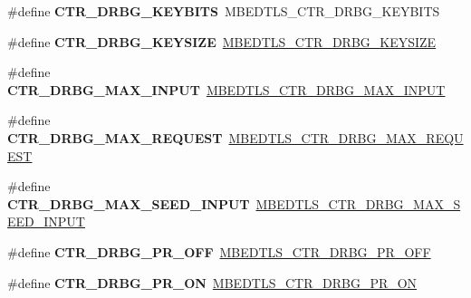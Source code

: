 \begin{DoxyCompactItemize}
\item 
\mbox{\label{compat-1_83_8h_ad7fddfff369d259329ff0f7c64063da0}} 
\#define {\bfseries C\+T\+R\+\_\+\+D\+R\+B\+G\+\_\+\+K\+E\+Y\+B\+I\+TS}~M\+B\+E\+D\+T\+L\+S\+\_\+\+C\+T\+R\+\_\+\+D\+R\+B\+G\+\_\+\+K\+E\+Y\+B\+I\+TS
\item 
\mbox{\label{compat-1_83_8h_a7e724588e94f73bd3fb7623e3f191913}} 
\#define {\bfseries C\+T\+R\+\_\+\+D\+R\+B\+G\+\_\+\+K\+E\+Y\+S\+I\+ZE}~\mbox{\hyperlink{ctr__drbg_8h_af81b83e7d7d9709f0b61c6ee34ee848e}{M\+B\+E\+D\+T\+L\+S\+\_\+\+C\+T\+R\+\_\+\+D\+R\+B\+G\+\_\+\+K\+E\+Y\+S\+I\+ZE}}
\item 
\mbox{\label{compat-1_83_8h_aa422ee06cd5836113c0068996fa9560c}} 
\#define {\bfseries C\+T\+R\+\_\+\+D\+R\+B\+G\+\_\+\+M\+A\+X\+\_\+\+I\+N\+P\+UT}~\mbox{\hyperlink{ctr__drbg_8h_a9eeb62804173b22977cca5a7565bbe78}{M\+B\+E\+D\+T\+L\+S\+\_\+\+C\+T\+R\+\_\+\+D\+R\+B\+G\+\_\+\+M\+A\+X\+\_\+\+I\+N\+P\+UT}}
\item 
\mbox{\label{compat-1_83_8h_a97273e0c80ab6111bf79f05834f174bf}} 
\#define {\bfseries C\+T\+R\+\_\+\+D\+R\+B\+G\+\_\+\+M\+A\+X\+\_\+\+R\+E\+Q\+U\+E\+ST}~\mbox{\hyperlink{ctr__drbg_8h_a5b787e6157d91055d7c07d40f519cf52}{M\+B\+E\+D\+T\+L\+S\+\_\+\+C\+T\+R\+\_\+\+D\+R\+B\+G\+\_\+\+M\+A\+X\+\_\+\+R\+E\+Q\+U\+E\+ST}}
\item 
\mbox{\label{compat-1_83_8h_aeeb6d3716faa516c3b90d6587de119dc}} 
\#define {\bfseries C\+T\+R\+\_\+\+D\+R\+B\+G\+\_\+\+M\+A\+X\+\_\+\+S\+E\+E\+D\+\_\+\+I\+N\+P\+UT}~\mbox{\hyperlink{ctr__drbg_8h_a1b944a1ceb01e5749008fbf27a6706e4}{M\+B\+E\+D\+T\+L\+S\+\_\+\+C\+T\+R\+\_\+\+D\+R\+B\+G\+\_\+\+M\+A\+X\+\_\+\+S\+E\+E\+D\+\_\+\+I\+N\+P\+UT}}
\item 
\mbox{\label{compat-1_83_8h_ad15c071c711a60200f5dcbbcb191c9eb}} 
\#define {\bfseries C\+T\+R\+\_\+\+D\+R\+B\+G\+\_\+\+P\+R\+\_\+\+O\+FF}~\mbox{\hyperlink{ctr__drbg_8h_a9651ed4c66749bb7f232b93681593834}{M\+B\+E\+D\+T\+L\+S\+\_\+\+C\+T\+R\+\_\+\+D\+R\+B\+G\+\_\+\+P\+R\+\_\+\+O\+FF}}
\item 
\mbox{\label{compat-1_83_8h_ac689b93ae32164241a48cee742a8fc74}} 
\#define {\bfseries C\+T\+R\+\_\+\+D\+R\+B\+G\+\_\+\+P\+R\+\_\+\+ON}~\mbox{\hyperlink{ctr__drbg_8h_ae534608231e768e8cf4010e1aa74dba8}{M\+B\+E\+D\+T\+L\+S\+\_\+\+C\+T\+R\+\_\+\+D\+R\+B\+G\+\_\+\+P\+R\+\_\+\+ON}}

\end{DoxyCompactItemize}
